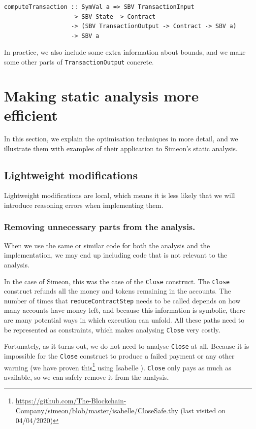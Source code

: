 \documentclass[english,runningheads]{llncs}
\begin{document}
\begin{verbatim}
computeTransaction :: SymVal a => SBV TransactionInput
                   -> SBV State -> Contract
                   -> (SBV TransactionOutput -> Contract -> SBV a)
                   -> SBV a
\end{verbatim}

In practice, we also include some extra information about bounds,
and we make some other parts of \texttt{TransactionOutput} concrete.

\section{Making static analysis more efficient\label{sec:Making-static-analysis-efficient}}

In this section, we explain the optimisation techniques in more detail,
and we illustrate them with examples of their application to Simeon's static analysis.

\subsection{Lightweight modifications\label{subsec:Lightweight-modifications}}

Lightweight modifications are local, which means it is less likely that we
will introduce reasoning errors when implementing them.

\subsubsection{Removing unnecessary parts from the analysis.}

When we use the same or similar code for both the analysis and the
implementation, we may end up including code that is not relevant
to the analysis.

In the case of Simeon, this was the case of the \texttt{Close} construct.
The \texttt{Close} construct refunds all the money and tokens remaining
in the accounts. The number of times that \texttt{reduceContractStep} needs
to be called depends on how many accounts have money left, and because
this information is symbolic, there are many potential ways in which execution
can unfold. All these paths need to be represented as constraints, which
makes analysing \texttt{Close} very costly.

Fortunately, as it turns out, we do not need to analyse \texttt{Close} at all.
Because it is impossible for the \texttt{Close} construct to produce a failed payment
or any other warning (we have proven this\footnote{\url{https://github.com/The-Blockchain-Company/simeon/blob/master/isabelle/CloseSafe.thy} (last visited on 04/04/2020)} using Isabelle \cite{nipkow2002isabelle}). \texttt{Close} only pays as much as available,
so we can safely remove it from the analysis.
\end{document}
